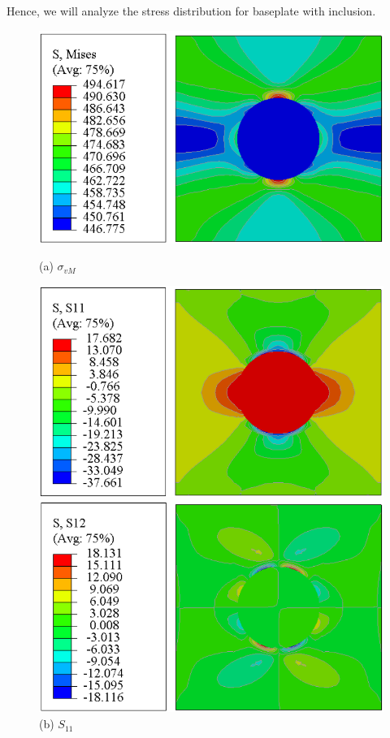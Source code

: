 \documentclass[12pt]{article}
\begin{document}
Hence, we will analyze the stress distribution for baseplate with inclusion. 
\vspace{1em}

\begin{figure}[H]
    \centering
    \begin{minipage}{0.48\textwidth}
        \centering
        \includegraphics[width=\textwidth]{images/MISES.png}
        \caption*{(a) $\sigma_{vM}$}
    \end{minipage}
    \hfill
    \begin{minipage}{0.48\textwidth}
        \centering
        \includegraphics[width=\textwidth]{images/S11.png}
        \caption*{(b) $S_{11}$}
    \end{minipage}
    \vspace{1em}
    \begin{minipage}{0.48\textwidth}
        \centering
        \includegraphics[width=\textwidth]{images/S12.png}

\end{minipage}
\end{figure}
\end{document}
